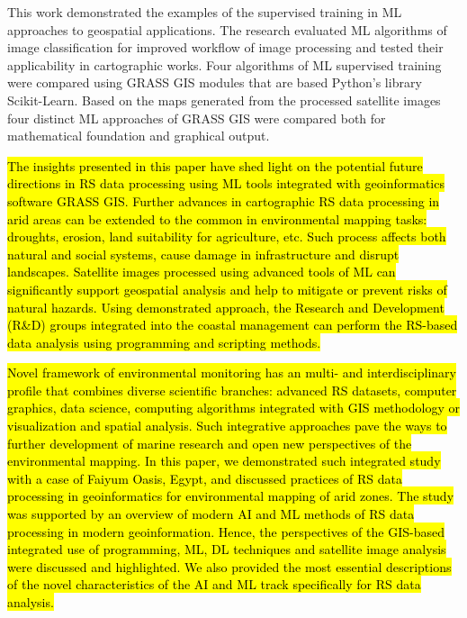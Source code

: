 \documentclass[final,5p,times,twocolumn]{elsarticle}
\begin{document}
This work demonstrated the examples of the supervised training in ML approaches to geospatial applications. The research evaluated ML algorithms of image classification for improved workflow of image processing and tested their applicability in cartographic works. Four algorithms of ML supervised training were compared using GRASS GIS modules that are based Python's library Scikit-Learn. Based on the maps generated from the processed satellite images four distinct ML approaches of GRASS GIS were compared both for mathematical foundation and graphical output. 

\hl{The insights presented in this paper have shed light on the potential future directions in RS data processing using ML tools integrated with geoinformatics software GRASS GIS. Further advances in cartographic RS data processing in arid areas can be extended to the common in environmental mapping tasks:  droughts, erosion, land suitability for agriculture, etc. Such process affects both natural and social systems, cause damage in infrastructure and disrupt landscapes. Satellite images processed using advanced tools of ML can significantly support geospatial analysis and help to mitigate or prevent risks of natural hazards. Using demonstrated approach, the Research and Development (R\&D) groups integrated into the coastal management can perform the RS-based data analysis using programming and scripting methods.}

\hl{Novel framework of environmental monitoring has an multi- and interdisciplinary profile that combines diverse scientific branches: advanced RS datasets, computer graphics, data science, computing algorithms integrated with GIS methodology or visualization and spatial analysis. Such integrative approaches pave the ways to further development of marine research and open new perspectives of the environmental mapping. In this paper, we demonstrated such integrated study with a case of Faiyum Oasis, Egypt, and discussed practices of RS data processing in geoinformatics for environmental mapping of arid zones. The study was supported by an overview of modern AI and ML methods of RS data processing in modern geoinformation. Hence, the perspectives of the GIS-based integrated use of programming, ML, DL techniques and satellite image analysis were discussed and highlighted. We also provided the most essential descriptions of the novel characteristics of the AI and ML track specifically for RS data analysis. }
\end{document}
